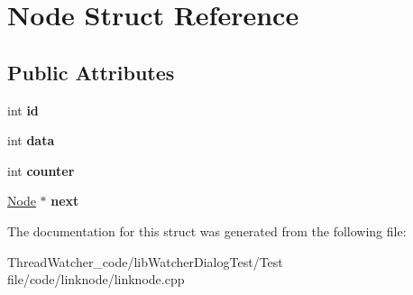 \hypertarget{struct_node}{\section{Node Struct Reference}
\label{struct_node}
}
\subsection*{Public Attributes}
\begin{DoxyCompactItemize}
\item 
\hypertarget{struct_node_a59a543130a10c95f1e8642cf8c5645e8}{int {\bfseries id}}\label{struct_node_a59a543130a10c95f1e8642cf8c5645e8}

\item 
\hypertarget{struct_node_a87c003c9f600e3fc58e6e90835f0b605}{int {\bfseries data}}\label{struct_node_a87c003c9f600e3fc58e6e90835f0b605}

\item 
\hypertarget{struct_node_ae2392a7e4b94b16a648ea83423d2475d}{int {\bfseries counter}}\label{struct_node_ae2392a7e4b94b16a648ea83423d2475d}

\item 
\hypertarget{struct_node_ac04749ecfcee79224cfbfa0d9c777902}{\hyperlink{struct_node}{Node} $\ast$ {\bfseries next}}\label{struct_node_ac04749ecfcee79224cfbfa0d9c777902}

\end{DoxyCompactItemize}


The documentation for this struct was generated from the following file\+:\begin{DoxyCompactItemize}
\item 
Thread\+Watcher\+\_\+code/lib\+Watcher\+Dialog\+Test/\+Test file/code/linknode/linknode.\+cpp\end{DoxyCompactItemize}
